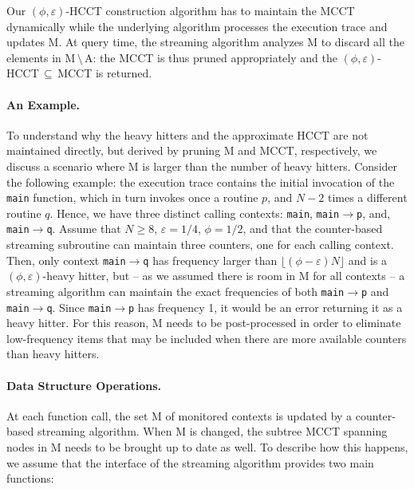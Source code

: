Our $(\phi,\varepsilon)$-HCCT construction algorithm has to maintain the MCCT dynamically while the underlying algorithm processes the execution trace and updates M. At query time, the streaming algorithm analyzes M to discard all the elements in M$\,\setminus\,$A: the MCCT is thus pruned appropriately and the $(\phi,\varepsilon)$-HCCT$\,\subseteq\,$MCCT is returned.

\paragraph*{An Example.} To understand why the heavy hitters and the approximate HCCT are not maintained directly, but derived by pruning M and MCCT, respectively, we discuss a scenario where M is larger than the number of heavy hitters. Consider the following example: the execution trace contains the initial invocation of the {\tt main} function, which in turn invokes once a routine $p$, and $N-2$ times a different routine $q$. Hence, we have three distinct calling contexts: {\tt main}, {\tt main}$\rightarrow${\tt p}, and, {\tt main}$\rightarrow${\tt q}. Assume that $N\ge 8$, $\varepsilon=1/4$, $\phi=1/2$, and that the counter-based streaming subroutine can maintain three counters, one for each calling context. Then, only context {\tt main}$\rightarrow${\tt q} has frequency larger than $\lfloor(\phi-\varepsilon)N\rfloor$ and is a $(\phi,\varepsilon)$-heavy hitter, but -- as we assumed there is room in M for all contexts -- a streaming algorithm can maintain the exact frequencies of both {\tt main}$\rightarrow${\tt p} and {\tt main}$\rightarrow${\tt q}. Since {\tt main}$\rightarrow${\tt p} has frequency 1, it would be an error returning it as a heavy hitter. For this reason, M needs to be post-processed in order to eliminate low-frequency items that may be included when there are more available counters than heavy hitters.

\paragraph*{Data Structure Operations.} At each function call, the set M of monitored contexts is updated by a counter-based streaming algorithm. When M is changed, the subtree MCCT spanning nodes in M needs to be brought up to date as well. To describe how this happens, we assume that the interface of the streaming algorithm provides two main functions:


